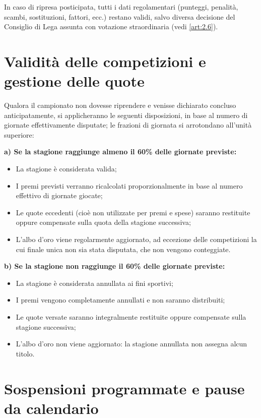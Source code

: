 In caso di ripresa posticipata, tutti i dati regolamentari (punteggi, penalità, scambi, sostituzioni, fattori, ecc.) restano validi, salvo diversa decisione del Consiglio di Lega assunta con votazione straordinaria (vedi \ref{art:2.6}).

\section{Validità delle competizioni e gestione delle quote}
\label{art:8.2}

Qualora il campionato non dovesse riprendere e venisse dichiarato concluso anticipatamente, si applicheranno le seguenti disposizioni, in base al numero di giornate effettivamente disputate; le frazioni di giornata si arrotondano all'unità superiore:

\textbf{a) Se la stagione raggiunge almeno il 60\% delle giornate previste:}
\begin{itemize}
\item La stagione è considerata valida;
\item I premi previsti verranno ricalcolati proporzionalmente in base al numero effettivo di giornate giocate;
\item Le quote eccedenti (cioè non utilizzate per premi e spese) saranno restituite oppure compensate sulla quota della stagione successiva;
\item L'albo d'oro viene regolarmente aggiornato, ad eccezione delle competizioni la cui finale unica non sia stata disputata, che non vengono conteggiate.
\end{itemize}

\textbf{b) Se la stagione non raggiunge il 60\% delle giornate previste:}
\begin{itemize}
\item La stagione è considerata annullata ai fini sportivi;
\item I premi vengono completamente annullati e non saranno distribuiti;
\item Le quote versate saranno integralmente restituite oppure compensate sulla stagione successiva;
\item L'albo d'oro non viene aggiornato: la stagione annullata non assegna alcun titolo.
\end{itemize}

\section{Sospensioni programmate e pause da calendario}
\label{art:8.3}
 
